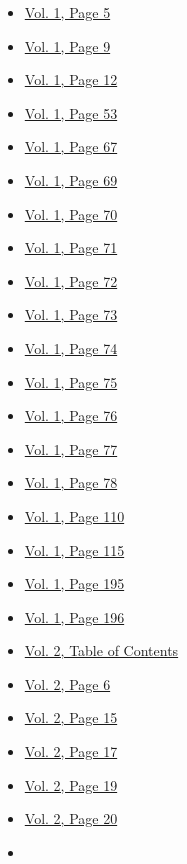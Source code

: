 \begin{itemize}
  \begin{itemize}
  \tightlist
  \item
    \protect\hyperlink{g-page-13}{Vol. 1, Page 5}
  \item
    \protect\hyperlink{g-page-17}{Vol. 1, Page 9}
  \item
    \protect\hyperlink{g-page-20}{Vol. 1, Page 12}
  \item
    \protect\hyperlink{g-page-61}{Vol. 1, Page 53}
  \item
    \protect\hyperlink{g-page-75}{Vol. 1, Page 67}
  \item
    \protect\hyperlink{g-page-77}{Vol. 1, Page 69}
  \item
    \protect\hyperlink{g-page-78}{Vol. 1, Page 70}
  \item
    \protect\hyperlink{g-page-79}{Vol. 1, Page 71}
  \item
    \protect\hyperlink{g-page-80}{Vol. 1, Page 72}
  \item
    \protect\hyperlink{g-page-81}{Vol. 1, Page 73}
  \item
    \protect\hyperlink{g-page-82}{Vol. 1, Page 74}
  \item
    \protect\hyperlink{g-page-83}{Vol. 1, Page 75}
  \item
    \protect\hyperlink{g-page-84}{Vol. 1, Page 76}
  \item
    \protect\hyperlink{g-page-85}{Vol. 1, Page 77}
  \item
    \protect\hyperlink{g-page-86}{Vol. 1, Page 78}
  \item
    \protect\hyperlink{g-page-118}{Vol. 1, Page 110}
  \item
    \protect\hyperlink{g-page-123}{Vol. 1, Page 115}
  \item
    \protect\hyperlink{g-page-203}{Vol. 1, Page 195}
  \item
    \protect\hyperlink{g-page-204}{Vol. 1, Page 196}
  \item
    \protect\hyperlink{g-page-211}{Vol. 2, Table of Contents}
  \item
    \protect\hyperlink{g-page-218}{Vol. 2, Page 6}
  \item
    \protect\hyperlink{g-page-227}{Vol. 2, Page 15}
  \item
    \protect\hyperlink{g-page-229}{Vol. 2, Page 17}
  \item
    \protect\hyperlink{g-page-231}{Vol. 2, Page 19}
  \item
    \protect\hyperlink{g-page-232}{Vol. 2, Page 20}
  \item

\end{itemize}
\end{itemize}
